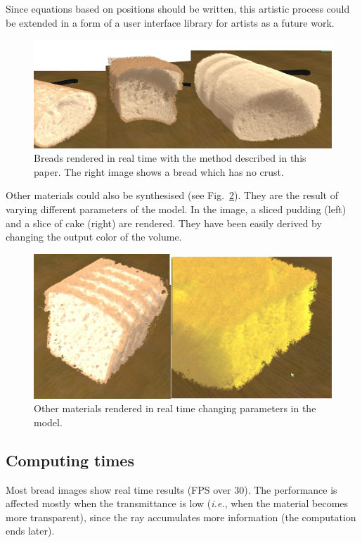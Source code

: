 \documentclass[oneside,a4paper,english,links]{amca}
\begin{document}
Since equations based on positions should be written, this artistic process could be extended in a form of a user interface library for artists as a future work.

\begin{figure}[htb!]
  \centerline{\includegraphics[scale=0.25]{fig5}}
  \caption{Breads rendered in real time with the method described in this paper. The right image shows a bread which has no crust. }
  \label{fg:fig5}
\end{figure}

Other materials could also be synthesised (see Fig.~\ref{fg:fig6}). They are the result of varying different parameters of the model. In the image, a sliced pudding (left) and a slice of cake (right) are rendered. They have been easily derived by changing the output color of the volume.

\begin{figure}[htb!]
  \centerline{\includegraphics[scale=0.25]{fig6}}
  \caption{Other materials rendered in real time changing parameters in the model. }
  \label{fg:fig6}
\end{figure}


\subsection{Computing times}
Most bread images show real time results (FPS over 30). The performance is affected mostly when the transmittance is low ({\em i.e.}, when the material becomes more transparent), since the ray accumulates more information (the computation ends later).
\end{document}
